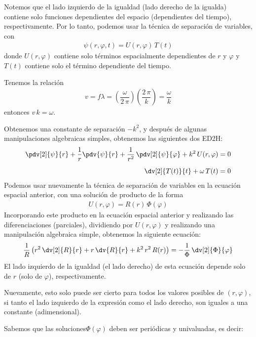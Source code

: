 Notemos que el lado izquierdo de la igualdad (lado derecho de la igualda) contiene solo funciones dependientes del espacio (dependientes del tiempo), respectivamente. Por lo tanto, podemos usar la técnica de separación de variables, con
\begin{align*}
\psi (r, \varphi, t) = U(r, \varphi) \, T(t)
\end{align*}
donde $U (r, \varphi)$ contiene solo términos espacialmente dependientes de $r$ y $\varphi$ y $T (t)$ contiene solo el término dependiente del tiempo.
\par
Tenemos la relación
\begin{align*}
v = f \lambda = \left( \dfrac{\omega}{2 \, \pi} \right) \left( \dfrac{2 \, \pi}{k} \right) = \dfrac{\omega}{k}
\end{align*}
entonces $v \, k = \omega$.
\par
Obtenemos una constante de separación $-k^{2}$, y después de algunas manipulaciones algebraicas simples, obtenemos las siguientes dos ED2H:
\begin{align*}
\pdv[2]{\psi}{r} + \dfrac{1}{r} \pdv{\psi}{r} + \dfrac{1}{r^{2}} \, \pdv[2]{\psi}{\varphi} + k^{2} \, U(r, \varphi) &= 0\\[0.5em]
\dv[2]{T(t)}{t} + \omega \, T(t) &= 0
\end{align*}
Podemos usar nuevamente la técnica de separación de variables en la ecuación espacial anterior, con una solución de producto de la forma
\begin{align*}
U(r, \varphi) = R(r) \, \Phi (\varphi)
\end{align*}
Incorporando este producto en la ecuación espacial anterior y realizando las diferenciaciones (parciales), dividiendo por $U(r, \varphi)$ y realizando una manipulación algebraica simple, obtenemos la siguiente ecuación:
\begin{align*}
\dfrac{1}{R} \left( r^{2} \, \dv[2]{R}{r} +  r \, \dv{R}{r} + k^{2} \, r^{2} \, R(r) \right) = - \dfrac{1}{\Phi} \, \dv[2]{\Phi}{\varphi}
\end{align*}
El lado izquierdo de la igualdad (el lado derecho) de esta ecuación depende solo de $r$ (solo de $\varphi$), respectivamente.
\par
Nuevamente, esto solo puede ser cierto para todos los valores posibles de $(r, \varphi)$, si tanto el lado izquierdo de la expresión como el lado derecho, son iguales a una constante (adimensional).
\par
Sabemos que las soluciones$\Phi(\varphi)$ deben ser periódicas y univaluadas, es decir:

